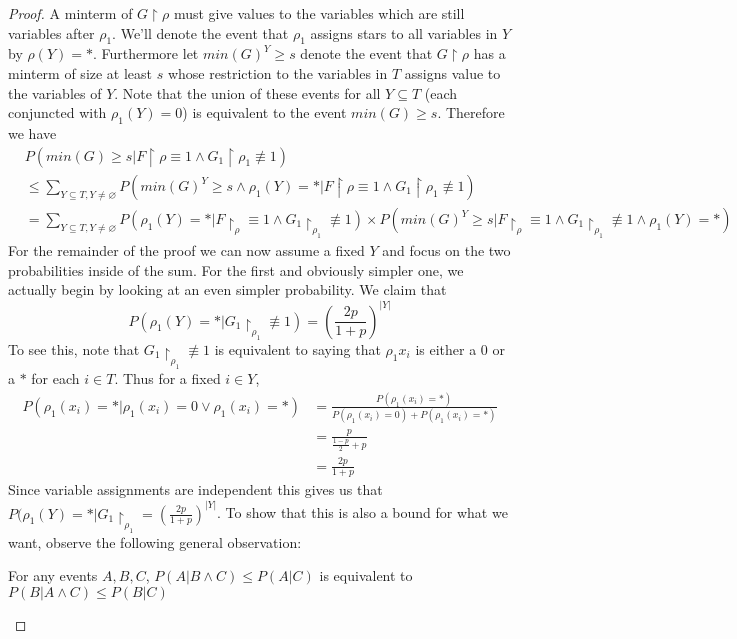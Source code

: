 \begin{proof}
A minterm of $G \restriction \rho$ must give values to the variables which are still variables after $\rho_1$. We'll denote the event that $\rho_1$ assigns stars to all variables in $Y$ by $\rho(Y) = *$. Furthermore let $min(G)^Y \geq s$ denote the event that $G \restriction \rho$ has a minterm of size at least $s$ whose restriction to the variables in $T$ assigns value to the variables of $Y$. Note that the union of these events for all $Y \subseteq T$ (each conjuncted with $\rho_1(Y) = 0$) is equivalent to the event $min(G) \geq s$. Therefore we have
\begin{align*}
	& P(min(G) \geq s | F \restriction \rho \equiv 1 \wedge G_1 \restriction \rho_1 \not\equiv 1) \\
	&\leq \sum_{Y \subseteq T, Y \neq \varnothing} P(min(G)^Y \geq s \wedge \rho_1(Y) = * | F\restriction \rho \equiv 1 \wedge G_1 \restriction \rho_1 \not\equiv 1) \\
	&= \sum_{Y \subseteq T, Y \neq \varnothing} P(\rho_1(Y) = *|F \restriction_{\rho} \equiv 1 \wedge G_1 \restriction_{\rho_1} \not\equiv 1) \times P(min(G)^Y \geq s | F \restriction_{\rho} \equiv 1 \wedge G_1 \restriction_{\rho_1} \not\equiv 1 \wedge \rho_1(Y) = *)
\end{align*} 
For the remainder of the proof we can now assume a fixed $Y$ and focus on the two probabilities inside of the sum. For the first and obviously simpler one, we actually begin by looking at an even simpler probability. We claim that 
\[ P(\rho_1(Y) = *| G_1 \restriction_{\rho_1} \not\equiv 1) = \left( \frac{2p}{1+p} \right)^{|Y|} \]
To see this, note that $G_1 \restriction_{\rho_1} \not\equiv 1$ is equivalent to saying that $\rho_1{x_i}$ is either a $0$ or a $*$ for each $i \in T$. Thus for a fixed $i \in Y$, 
\begin{align*}
	P(\rho_1(x_i) = * | \rho_1(x_i) = 0 \vee \rho_1(x_i) = *) &= \frac{P(\rho_1(x_i) = *)}{P(\rho_1(x_i) = 0) + P(\rho_1(x_i) = *)} \\
	&= \frac{p}{\frac{1-p}{2} + p} \\
	&= \frac{2p}{1+p}
\end{align*} 
Since variable assignments are independent this gives us that $P(\rho_1(Y) = *|G_1 \restriction_{\rho_1} = \left( \frac{2p}{1+p} \right)^{|Y|}$. To show that this is also a bound for what we want, observe the following general observation:
\begin{center}
	For any events $A,B,C$, $P(A | B \wedge C) \leq P(A|C)$ is equivalent to $P(B|A \wedge C) \leq P(B|C)$
\end{center}

\end{proof}
